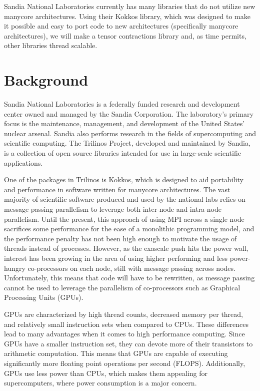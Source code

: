 \documentclass[proposal]{hmcclinic}
\begin{document}
Sandia National Laboratories currently has many libraries that do not utilize
new manycore architectures. Using their Kokkos library, which was designed to
make it possible and easy to port code to new architectures (specifically
manycore architectures), we will make a tensor contractions library and, as
time permits, other libraries thread scalable.

\section{Background}

Sandia National Laboratories is a federally funded research and development
center owned and managed by the Sandia Corporation.  The laboratory's primary
focus is the maintenance, management, and development of the United States'
nuclear arsenal.  Sandia also performs research in the fields of supercomputing
and scientific computing.  The Trilinos Project, developed and maintained by
Sandia, is a collection of open source libraries intended for use in large-scale
scientific applications.

One of the packages in Trilinos is Kokkos, which is designed to aid portability
and performance in software written for manycore architectures.  The vast
majority of scientific software produced and used by the national labs relies on
message passing parallelism to leverage both inter-node and intra-node
parallelism.  Until the present, this approach of using MPI across a single node
sacrifices some performance for the ease of a monolithic programming model, and
the performance penalty has not been high enough to motivate the usage of
threads instead of processes.  However, as the exascale push hits the power
wall, interest has been growing in the area of using higher performing and less
power-hungry co-processors on each node, still with message passing across
nodes.  Unfortunately, this means that code will have to be rewritten, as
message passing cannot be used to leverage the parallelism of co-processors such
as Graphical Processing Units (GPUs).

GPUs are characterized by high thread counts, decreased memory per thread, and
relatively small instruction sets when compared to CPUs. These differences lead
to many advantages when it comes to high performance computing. Since GPUs have
a smaller instruction set, they can devote more of their transistors to
arithmetic computation. This means that GPUs are capable of executing
significantly more floating point operations per second (FLOPS). Additionally,
GPUs use less power than CPUs, which makes them appealing for supercomputers,
where power consumption is a major concern.
\end{document}
